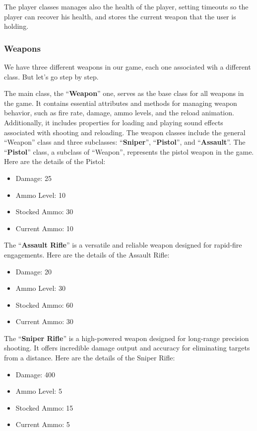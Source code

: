\documentclass[12pt,a4paper,oneside]{article}
\theoremstyle{definition}
\begin{document}
The player classes manages also the health of the player, setting timeouts so the player can recover his health, and stores the current weapon that the user is holding. 


\subsubsection{Weapons}\label{weapons}

We have three different weapons in our game, each one associated wih a different class. But let's go step by step.

The main class, the ``\textbf{Weapon}'' one, serves as the base class for all weapons in the game. It contains essential attributes and methods for managing weapon behavior, such as fire rate, damage, ammo levels, and the reload animation. Additionally, it includes properties for loading and playing sound effects associated with shooting and reloading. The weapon classes include the general ``Weapon'' class and three subclasses: ``\textbf{Sniper}'', ``\textbf{Pistol}'', and ``\textbf{Assault}''.
The ``\textbf{Pistol}'' class, a subclass of ``Weapon'', represents the pistol weapon in the game. Here are the details of the Pistol:

\begin{itemize}
    \item Damage: 25
    \item Ammo Level: 10
    \item Stocked Ammo: 30
    \item Current Ammo: 10
\end{itemize}

The ``\textbf{Assault Rifle}'' is a versatile and reliable weapon designed for rapid-fire engagements. Here are the details of the Assault Rifle:

\begin{itemize}
    \item Damage: 20
    \item Ammo Level: 30
    \item Stocked Ammo: 60
    \item Current Ammo: 30
\end{itemize}

The ``\textbf{Sniper Rifle}'' is a high-powered weapon designed for long-range precision shooting. It offers incredible damage output and accuracy for eliminating targets from a distance. Here are the details of the Sniper Rifle:

\begin{itemize}
    \item Damage: 400
    \item Ammo Level: 5
    \item Stocked Ammo: 15
    \item Current Ammo: 5
\end{itemize}
\end{document}
